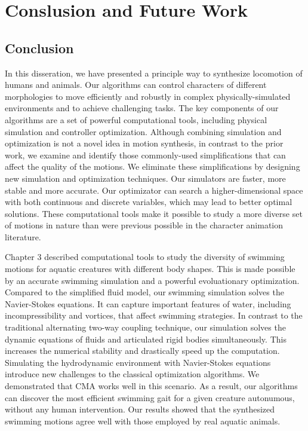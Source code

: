 \chapter{Conslusion and Future Work}

\section{Conclusion}
In this disseration, we have presented a principle way to synthesize locomotion of humans and animals. Our algorithms can control characters of different morphologies to move efficiently and robustly in complex physically-simulated environments and to achieve challenging tasks. The key components of our algorithms are a set of powerful computational tools, including physical simulation and controller optimization. Although combining simulation and optimization is not a novel idea in motion synthesis, in contrast to the prior work, we examine and identify those commonly-used simplifications that can affect the quality of the motions. We eliminate these simplifications by designing new simulation and optimization techniques. Our simulators are faster, more stable and more accurate. Our optimizator can search a higher-dimensional space with both continuous and discrete variables, which may lead to better optimal solutions. These computational tools make it possible to study a more diverse set of motions in nature than were previous possible in the character animation literature.

Chapter 3 described computational tools to study the diversity of swimming motions for aquatic creatures with different body shapes. This is made possible by an accurate swimming simulation and a powerful evoluationary optimization. Compared to the simplified fluid model, our swimming simulation solves the Navier-Stokes equations. It can capture important features of water, including incompressibility and vortices, that affect swimming strategies. In contrast to the traditional alternating two-way coupling technique, our simulation solves the dynamic equations of fluids and articulated rigid bodies simultaneously. This increases the numerical stability and drastically speed up the computation. Simulating the hydrodynamic environment with Navier-Stokes equations introduce new challenges to the classical optimization algorithms. We demonstrated that CMA works well in this scenario. As a result, our algorithms can discover the most efficient swimming gait for a given creature autonumous, without any human intervention. Our results showed that the synthesized swimming motions agree well with those employed by real aquatic animals.

